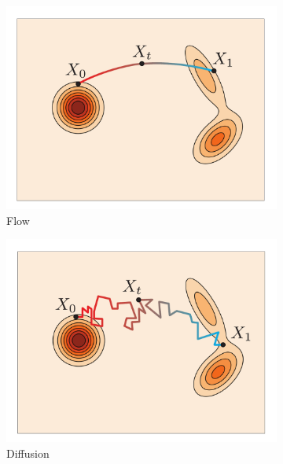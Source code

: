 \documentclass{fairmeta}
\numberwithin{equation}{section}
\begin{document}
\begin{figure}
\centering
\begin{subfigure}[b]{0.24\textwidth}
\centering
\includegraphics[width=\textwidth]{assets/types/type_flow.pdf}
\caption{Flow}
\label{fig:types:flow}
\end{subfigure}
\hfill
\begin{subfigure}[b]{0.24\textwidth}
\centering
\includegraphics[width=\textwidth]{assets/types/type_diffusion.pdf}
\caption{Diffusion}
\label{fig:types:diffusion}
\end{subfigure}
\hfill
\begin{subfigure}[b]{0.24\textwidth}
\centering

\end{subfigure}
\end{figure}
\end{document}
